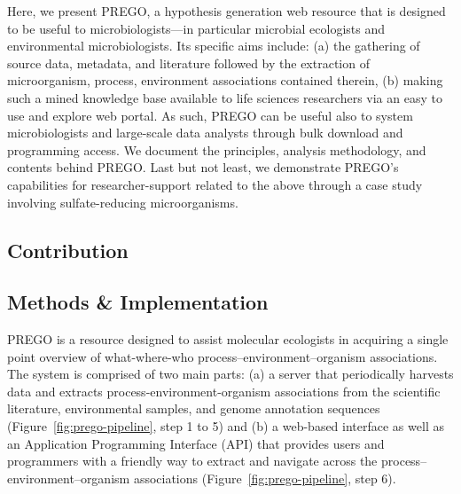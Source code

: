    Here, we present PREGO, a hypothesis generation web resource that is designed to be useful to microbiologists—in particular microbial ecologists and environmental microbiologists. 
   Its specific aims include: 
   (a) the gathering of source data, metadata, and literature followed by the extraction of microorganism, process, environment associations contained therein, 
   (b) making such a mined knowledge base available to life sciences researchers via an easy to use and explore web portal. 
   As such, PREGO can be useful also to system microbiologists and large-scale data analysts through bulk download and programming access. 
   We document the principles, analysis methodology, and contents behind PREGO. 
   Last but not least, we demonstrate PREGO's capabilities for researcher-support related to the above through a case study involving sulfate-reducing microorganisms.




\subsection{Contribution}
\label{sec:prego-contribution}


\subsection{Methods \& Implementation}
\label{sec:prego-methods}

   PREGO is a resource designed to assist molecular ecologists in acquiring a single point overview of what-where-who process–environment–organism associations. The system is comprised of two main parts: (a) a server that periodically harvests data and extracts process-environment-organism associations from the scientific literature, environmental samples, and genome annotation sequences (Figure~\ref{fig:prego-pipeline}, step 1 to 5) and (b) a web-based interface as well as an Application Programming Interface (API) that provides users and programmers with a friendly way to extract and navigate across the process–environment–organism associations (Figure~\ref{fig:prego-pipeline}, step 6).

